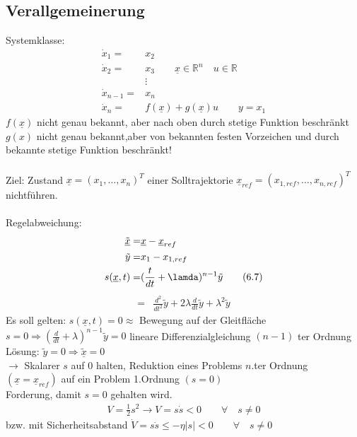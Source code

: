 \documentclass[11pt,a4paper]{article}
\begin{document}
\subsection{ Verallgemeinerung}
Systemklasse: 
\begin{align*}
\dot x_1 = &x_2 \\
\dot x_2 =& x_3 \qquad \underline x\in \mathbb{R}^n \quad u\in \mathbb{R}\\
&\vdots\\
\dot x_{n-1} =&x_n\\
\dot x_n =& f(\underline x) + g(\underline x)u \qquad y=x_1 \tag{6.6}
\end{align*}
$f(\underline x)$ nicht genau bekannt, aber nach oben durch stetige Funktion beschränkt $g(x)$ nicht genau bekannt,aber von bekannten festen Vorzeichen und durch bekannte stetige Funktion beschränkt!\\
\\
Ziel: Zustand $\underline x= (x_1,\dots, x_n)^T $ einer Solltrajektorie $\underline x_{ref} = (x_{1,ref},\dots, x_{n,ref})^T$ nichtführen. \\
\\
Regelabweichung: 
\begin{align*}
\underline{\tilde{x}} =& \underline x - \underline x_{ref}\\
\tilde y =& x_1 - x_{1,ref}\\
s(\underline x,t) =& (\frac{t}{dt} + \lamda)^{n-1}\tilde y \tag{6.7}\\
\end{align*}
\begin{align*}
=& \frac{d^2}{dt^2}\tilde y + 2\lambda \frac{d}{dt}\tilde y +\lambda^2 \tilde y
\end{align*}
Es soll gelten: $s(\underline x,t) = 0 \approx$ Bewegung auf der Gleitfläche\\
$s=0 \Rightarrow (\frac{d}{dt} + \lambda)^{n-1} \tilde y = 0$ lineare Differenzialgleichung $ (n-1)$ ter Ordnung \\
Lösung: $\tilde y= 0 \Rightarrow \tilde{\underline x} =0$  \\ 
$\rightarrow$ Skalarer $s$ auf $0$ halten, Reduktion eines Problems $n.$ter Ordnung $(\underline x=\underline x_{ref})$ auf ein Problem 1.Ordnung $(s=0)$\\
Forderung, damit $s=0$ gehalten wird.
\begin{align*}
V=\frac{1}{2}s^2 \rightarrow V=s\dot s <0 \qquad \forall \quad s\ne 0
\end{align*}
bzw. mit Sicherheitsabstand $\dot V = s\dot s \le -\eta|s| < 0\qquad \forall \quad s\ne 0$ 
\end{document}
